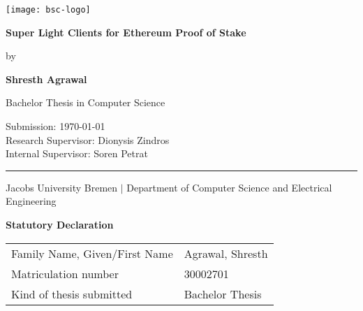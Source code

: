 \documentclass[a4paper,11pt,oneside]{article}
\newcommand{\mylastname}{Agrawal}
\newcommand{\myfirstname}{Shresth}
\newcommand{\mynumber}{30002701}
\newcommand{\myname}{\myfirstname{} \mylastname{}}
\newcommand{\mytitle}{Super Light Clients for Ethereum Proof of Stake}
\newcommand{\myresearchsupervisor}{Dionysis Zindros}
\newcommand{\myinternalsupervisor}{Soren Petrat}
\begin{document}

  \thispagestyle{empty}

  \begin{flushright}
    \texttt{[image: bsc-logo]}
  \end{flushright}
  \vspace*{40mm}
  \begin{center}
    \huge
    \textbf{\mytitle}
  \end{center}
  \vspace*{4mm}
  \begin{center}
   \Large by
  \end{center}
  \vspace*{4mm}
  \begin{center}
    \LARGE
    \textbf{\myname}
  \end{center}
  \vspace*{20mm}
  \begin{center}
    \Large
    Bachelor Thesis in Computer Science
  \end{center}
  \vfill
  \begin{flushleft}
    \large
    Submission: \today \hfill \\
    Research Supervisor: \myresearchsupervisor \\
    Internal Supervisor: \myinternalsupervisor \\
    \rule{\textwidth}{1pt}
  \end{flushleft}
  \begin{center}
    Jacobs University Bremen $|$ Department of Computer Science and Electrical Engineering
  \end{center}

  \newpage
  \thispagestyle{empty}

  \begin{center}
    \Large \textbf{Statutory Declaration}
    \vspace*{8mm}
  \end{center}

  \begin{center}
    \begin{tabular}{|l|p{85mm}|}
      \hline
      Family Name, Given/First Name & \mylastname, \myfirstname \\
      Matriculation number & \mynumber \\
      Kind of thesis submitted & Bachelor Thesis \\
      \hline
    \end{tabular}
    \vspace*{8mm}
  \end{center}
\end{document}

